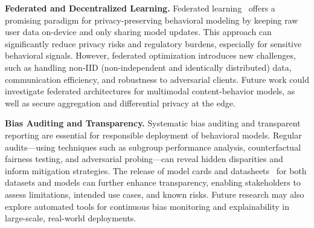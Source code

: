 \textbf{Federated and Decentralized Learning.} Federated learning~\cite{mcmahan2017communication} offers a promising paradigm for privacy-preserving behavioral modeling by keeping raw user data on-device and only sharing model updates. This approach can significantly reduce privacy risks and regulatory burdens, especially for sensitive behavioral signals. However, federated optimization introduces new challenges, such as handling non-IID (non-independent and identically distributed) data, communication efficiency, and robustness to adversarial clients. Future work could investigate federated architectures for multimodal content-behavior models, as well as secure aggregation and differential privacy at the edge.

\textbf{Bias Auditing and Transparency.} Systematic bias auditing and transparent reporting are essential for responsible deployment of behavioral models. Regular audits—using techniques such as subgroup performance analysis, counterfactual fairness testing, and adversarial probing—can reveal hidden disparities and inform mitigation strategies. The release of model cards and datasheets~\cite{mitchell2019model} for both datasets and models can further enhance transparency, enabling stakeholders to assess limitations, intended use cases, and known risks. Future research may also explore automated tools for continuous bias monitoring and explainability in large-scale, real-world deployments.
